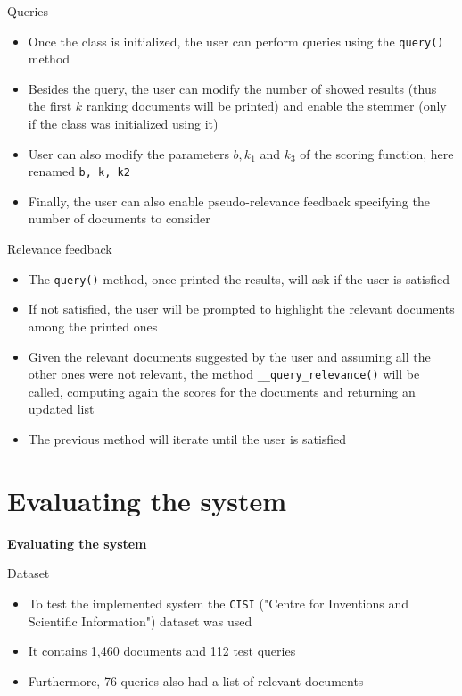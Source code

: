\documentclass[]{beamer}
\begin{document}
\begin{frame}{Queries}
    \begin{itemize}
        \item Once the class is initialized, the user can perform queries using the \texttt{query()} method
        \item Besides the query, the user can modify the number of showed results (thus the first $k$ ranking documents will be printed)
            and enable the stemmer (only if the class was initialized using it)
        \item User can also modify the parameters $b,k_1$ and $k_3$ of the scoring function, here renamed \texttt{b, k, k2}
        \item Finally, the user can also enable pseudo-relevance feedback specifying the number of documents to consider
    \end{itemize}
\end{frame}

\begin{frame}{Relevance feedback}
    \begin{itemize}
        \item The \texttt{query()} method, once printed the results, will ask if the user is satisfied
        \item If not satisfied, the user will be prompted to highlight the relevant documents among the printed ones
        \item Given the relevant documents suggested by the user and assuming all the other ones were not relevant, the method \texttt{\_\_query\_relevance()} will be called, computing again the scores for the documents and returning an updated list
        \item The previous method will iterate until the user is satisfied
    \end{itemize}
\end{frame}

\section{Evaluating the system}
\begin{frame}
    \begin{block}{}
        \centering
        \huge{\textbf{Evaluating the system}}
    \end{block}
\end{frame}

\begin{frame}{Dataset}
    \begin{itemize}
        \item To test the implemented system the \texttt{CISI} ("Centre for Inventions and Scientific Information") dataset was used 
        \item It contains 1,460 documents and 112 test queries
        \item Furthermore, 76 queries also had a list of relevant documents 
    \end{itemize}
\end{frame}
\end{document}
